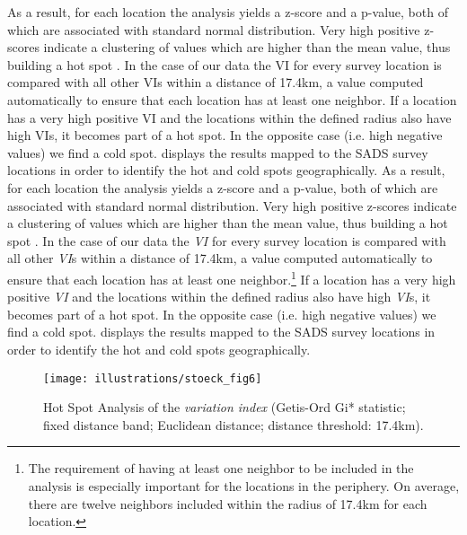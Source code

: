 \documentclass[output=paper]{LSP/langsci}
\begin{document}
As a result, for each location the analysis yields a z-score and a p-value, both of which are associated with standard normal distribution. Very high positive z-scores indicate a clustering of values which are higher than the mean value, thus building a hot spot \citep[65]{sibler_visualisierung_2011}. In the case of our data the VI for every survey location is compared with all other VIs within a distance of 17.4km, a value computed automatically to ensure that each location has at least one neighbor. If a location has a very high positive VI and the locations within the defined radius also have high VIs, it becomes part of a hot spot. In the opposite case (i.e. high negative values) we find a cold spot.  displays the results mapped to the SADS survey locations in order to identify the hot and cold spots geographically.
As a result, for each location the analysis yields a z-score and a p-value, both of which are associated with standard normal distribution. Very high positive z-scores indicate a clustering of values which are higher than the mean value, thus building a hot spot \citep[65]{sibler_visualisierung_2011}. In the case of our data the \emph{VI} for every survey location is compared with all other \emph{VI}s within a distance of 17.4km, a value computed automatically to ensure that each location has at least one neighbor.\footnote{The requirement of having at least one neighbor to be included in the analysis is especially important for the locations in the periphery. On average, there are twelve neighbors included within the radius of 17.4km for each location.} If a location has a very high positive \emph{VI} and the locations within the defined radius also have high \emph{VI}s, it becomes part of a hot spot. In the opposite case (i.e. high negative values) we find a cold spot.  displays the results mapped to the SADS survey locations in order to identify the hot and cold spots geographically.

\begin{figure}
\texttt{[image: illustrations/stoeck\_fig6]}
\label{fig:6}
\caption{Hot Spot Analysis of the \emph{variation index} (Getis-Ord Gi* statistic; fixed distance band; Euclidean distance; distance threshold: 17.4km).}
\end{figure}
\end{document}
